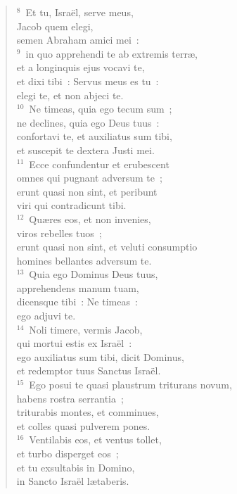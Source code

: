 \begin{verse}${}^{8}$~Et tu, Isra\"el, serve meus,\\ Jacob quem elegi,\\ semen Abraham amici mei~:\\
${}^{9}$~in quo apprehendi te ab extremis terr\ae ,\\ et a longinquis ejus vocavi te,\\ et dixi tibi~: Servus meus es tu~:\\ elegi te, et non abjeci te.\\
${}^{10}$~Ne timeas, quia ego tecum sum~;\\ ne declines, quia ego Deus tuus~:\\ confortavi te, et auxiliatus sum tibi,\\ et suscepit te dextera Justi mei.\\
${}^{11}$~Ecce confundentur et erubescent\\ omnes qui pugnant adversum te~;\\ erunt quasi non sint, et peribunt\\ viri qui contradicunt tibi.\\
${}^{12}$~Qu\ae res eos, et non invenies,\\ viros rebelles tuos~;\\ erunt quasi non sint, et veluti consumptio\\ homines bellantes adversum te.\\
${}^{13}$~Quia ego Dominus Deus tuus,\\ apprehendens manum tuam,\\ dicensque tibi~: Ne timeas~:\\ ego adjuvi te.\\
${}^{14}$~Noli timere, vermis Jacob,\\ qui mortui estis ex Isra\"el~:\\ ego auxiliatus sum tibi, dicit Dominus,\\ et redemptor tuus Sanctus Isra\"el.\\
${}^{15}$~Ego posui te quasi plaustrum triturans novum,\\ habens rostra serrantia~;\\ triturabis montes, et comminues,\\ et colles quasi pulverem pones.\\
${}^{16}$~Ventilabis eos, et ventus tollet,\\ et turbo disperget eos~;\\ et tu exsultabis in Domino,\\ in Sancto Isra\"el l\ae taberis.\\

\end{verse}
